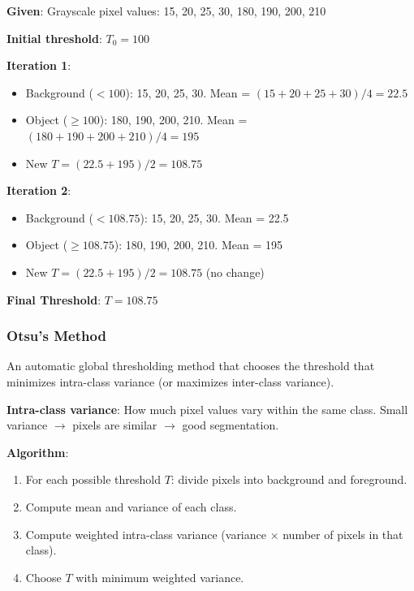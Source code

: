 \documentclass[11pt,a4paper]{article}
\begin{document}
\begin{tcolorbox}[colback=yellow!5!white,colframe=yellow!75!black,title=\textbf{Worked Example 6: Iterative Global Thresholding}]
\textbf{Given}: Grayscale pixel values: 15, 20, 25, 30, 180, 190, 200, 210

\textbf{Initial threshold}: $T_0 = 100$

\textbf{Iteration 1}:
\begin{itemize}
    \item Background ($< 100$): 15, 20, 25, 30. Mean = $(15+20+25+30)/4 = 22.5$
    \item Object ($\geq 100$): 180, 190, 200, 210. Mean = $(180+190+200+210)/4 = 195$
    \item New $T = (22.5 + 195) / 2 = 108.75$
\end{itemize}

\textbf{Iteration 2}:
\begin{itemize}
    \item Background ($< 108.75$): 15, 20, 25, 30. Mean = 22.5
    \item Object ($\geq 108.75$): 180, 190, 200, 210. Mean = 195
    \item New $T = (22.5 + 195) / 2 = 108.75$ (no change)
\end{itemize}

\textbf{Final Threshold}: $T = 108.75$
\end{tcolorbox}

\subsubsection{Otsu's Method}

An automatic global thresholding method that chooses the threshold that minimizes intra-class variance (or maximizes inter-class variance).

\textbf{Intra-class variance}: How much pixel values vary within the same class. Small variance $\to$ pixels are similar $\to$ good segmentation.

\textbf{Algorithm}:
\begin{enumerate}
    \item For each possible threshold $T$: divide pixels into background and foreground.
    \item Compute mean and variance of each class.
    \item Compute weighted intra-class variance (variance $\times$ number of pixels in that class).
    \item Choose $T$ with minimum weighted variance.
\end{enumerate}
\end{document}
